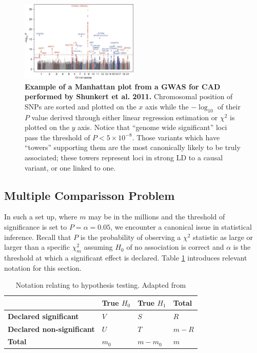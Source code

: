 \begin{figure}[H]
\centering
\includegraphics[width=0.5\textwidth]{Figures/man_ex.jpg}
\caption[Representative Manhattan plot with explanation of major features.]{\textbf{Example of a Manhattan plot from a \ac{GWAS} for \ac{CAD} performed by Shunkert et al. 2011.} Chromosomal position of \acp{SNP} are sorted and plotted on the $x$ axis while the $- \log_{10}$ of their $P$ value derived through either linear regression estimation or $\chi^2$ is plotted on the $y$ axis. Notice that ``genome wide significant'' loci pass the threshold of $P < 5 \times 10^{-8}$.  Those variants which have ``towers'' supporting them are the most canonically likely to be truly associated; these towers represent loci in strong \ac{LD} to a causal variant, or one linked to one.}
\end{figure}

\subsection{Multiple Comparisson Problem}

In such a set up, where $m$ may be in the millions and the threshold of significance is set to $P = \alpha = 0.05$, we encounter a canonical issue in statistical inference. Recall that $P$ is the probability of observing a $\chi^2$ statistic as large or larger than a specific $\chi^2_m$ assuming $H_0$ of no association is correct and $\alpha$ is the threshold at which a significant effect is declared. Table \ref{hyptest} introduces relevant notation for this section. 


\begin{table}[H]
\centering
\caption{Notation relating to hypothesis testing. Adapted from \cite{Sun2006}}
\label{hyptest}
\begin{tabular*}{.8\linewidth}{@{}llll@{}}
\toprule
                                  & \textbf{True $H_0$} & \textbf{True $H_1$} & \textbf{Total} \\ \midrule
\textbf{Declared significant}     & $V$                 & $S$                 & $R$            \\
\textbf{Declared non-significant} & $U$                 & $T$                 & $m - R$        \\
\textbf{Total}                    & $m_0$               & $m - m_0$           & $m$            \\ \bottomrule
\end{tabular*}
\end{table}


